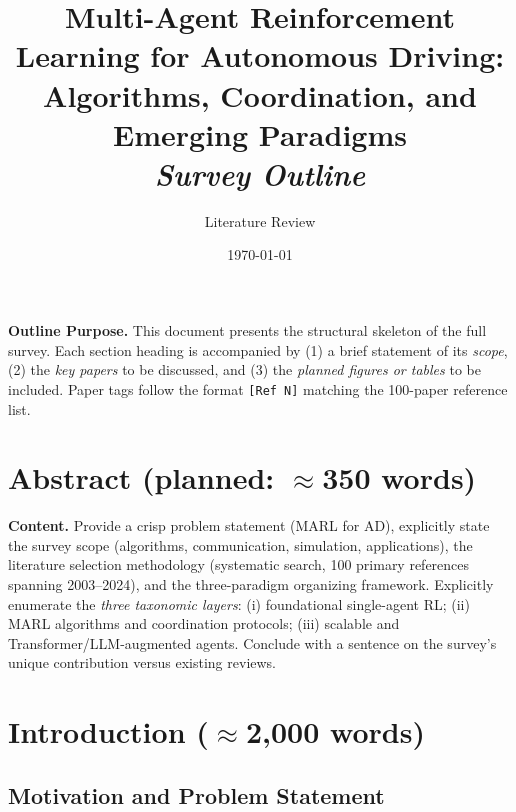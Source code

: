 \documentclass[12pt, a4paper]{article}
\title{\textbf{Multi-Agent Reinforcement Learning for Autonomous Driving:\\
Algorithms, Coordination, and Emerging Paradigms}\\[0.5em]
{\large \textit{Survey Outline}}}
\author{\large Literature Review}
\date{\today}
\begin{document}
\maketitle

\begin{outline_note}
\textbf{Outline Purpose.}
This document presents the structural skeleton of the full survey.
Each section heading is accompanied by (1) a brief statement of its \emph{scope},
(2) the \emph{key papers} to be discussed, and (3) the \emph{planned figures or
tables} to be included.
Paper tags follow the format \texttt{[Ref\,N]} matching the 100-paper reference list.
\end{outline_note}

\tableofcontents
\newpage

\section*{Abstract \textnormal{\small (planned: $\approx$350 words)}}

\begin{outline_note}
\textbf{Content.}
Provide a crisp problem statement (MARL for AD), explicitly state the survey
scope (algorithms, communication, simulation, applications), the literature
selection methodology (systematic search, 100 primary references spanning
2003--2024), and the three-paradigm organizing framework.  Explicitly enumerate
the \emph{three taxonomic layers}: (i) foundational single-agent RL; (ii) MARL
algorithms and coordination protocols; (iii) scalable and
Transformer/LLM-augmented agents.  Conclude with a sentence on the
survey's unique contribution versus existing reviews.
\end{outline_note}

\section{Introduction \textnormal{\small ($\approx$2{,}000 words)}}
\label{sec:intro}

\subsection{Motivation and Problem Statement}
\end{document}

